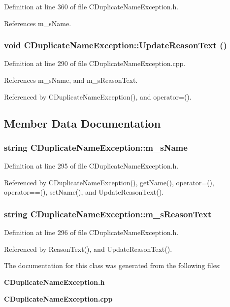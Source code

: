 Definition at line 360 of file CDuplicate\-Name\-Exception.h.

References m\_\-s\-Name.
\subsubsection{\setlength{\rightskip}{0pt plus 5cm}void CDuplicate\-Name\-Exception::Update\-Reason\-Text ()\hspace{0.3cm}{\tt  [protected]}}\label{classCDuplicateNameException_b0}




Definition at line 290 of file CDuplicate\-Name\-Exception.cpp.

References m\_\-s\-Name, and m\_\-s\-Reason\-Text.

Referenced by CDuplicate\-Name\-Exception(), and operator=().

\subsection{Member Data Documentation}
\subsubsection{\setlength{\rightskip}{0pt plus 5cm}string CDuplicate\-Name\-Exception::m\_\-s\-Name\hspace{0.3cm}{\tt  [private]}}\label{classCDuplicateNameException_o0}




Definition at line 295 of file CDuplicate\-Name\-Exception.h.

Referenced by CDuplicate\-Name\-Exception(), get\-Name(), operator=(), operator==(), set\-Name(), and Update\-Reason\-Text().
\subsubsection{\setlength{\rightskip}{0pt plus 5cm}string CDuplicate\-Name\-Exception::m\_\-s\-Reason\-Text\hspace{0.3cm}{\tt  [private]}}\label{classCDuplicateNameException_o1}




Definition at line 296 of file CDuplicate\-Name\-Exception.h.

Referenced by Reason\-Text(), and Update\-Reason\-Text().

The documentation for this class was generated from the following files:\begin{CompactItemize}
\item 
{\bf CDuplicate\-Name\-Exception.h}\item 
{\bf CDuplicate\-Name\-Exception.cpp}\end{CompactItemize}
